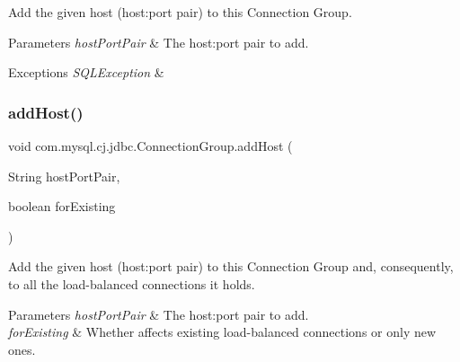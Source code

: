 Add the given host (host\+:port pair) to this Connection Group.


\begin{DoxyParams}{Parameters}
{\em host\+Port\+Pair} & The host\+:port pair to add. \\
\hline
\end{DoxyParams}

\begin{DoxyExceptions}{Exceptions}
{\em S\+Q\+L\+Exception} & \\
\hline
\end{DoxyExceptions}
\mbox{\label{classcom_1_1mysql_1_1cj_1_1jdbc_1_1_connection_group_a6476527606a8bbf591d41745c3ab32ea}} 
\subsubsection{\texorpdfstring{add\+Host()}{addHost()}\hspace{0.1cm}{\footnotesize\ttfamily [2/2]}}
{\footnotesize\ttfamily void com.\+mysql.\+cj.\+jdbc.\+Connection\+Group.\+add\+Host (\begin{DoxyParamCaption}\item[{String}]{host\+Port\+Pair,  }\item[{boolean}]{for\+Existing }\end{DoxyParamCaption})}

Add the given host (host\+:port pair) to this Connection Group and, consequently, to all the load-\/balanced connections it holds.


\begin{DoxyParams}{Parameters}
{\em host\+Port\+Pair} & The host\+:port pair to add. \\
\hline
{\em for\+Existing} & Whether affects existing load-\/balanced connections or only new ones. \\
\hline
\end{DoxyParams}
\mbox{\label{classcom_1_1mysql_1_1cj_1_1jdbc_1_1_connection_group_ad892402b4f3b73a6677ba6997f493bf6}} 
